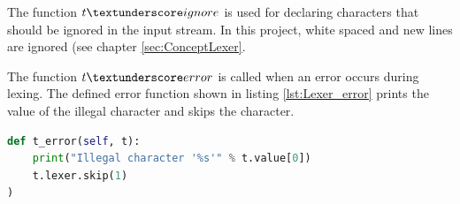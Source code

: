The function $t\textunderscore ignore$ is used for declaring characters that should be ignored in the input stream. In this project, white spaced and new lines are ignored (see chapter \ref{sec:ConceptLexer}.

The function $t\textunderscore error$ is called when an error occurs during lexing. The defined error function shown in listing \ref{lst:Lexer_error} prints the value of the illegal character and skips the character. \\

\begin{lstlisting}[language=Python,basicstyle=\scriptsize	,caption= Lexer error function,label= lst:Lexer_error]
def t_error(self, t):
    print("Illegal character '%s'" % t.value[0])
    t.lexer.skip(1)
)
\end{lstlisting}


